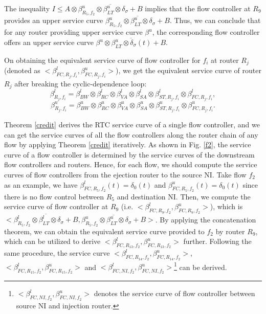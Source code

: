 \documentclass[preprint]{elsarticle}
\begin{document}
\begin{pf}
The inequality $I\leq A\otimes \overline{\beta_{R_5,f_2}^u\otimes\beta_{LT}^u\otimes\delta_\sigma+B}$ implies that the flow controller at $R_9$ provides an upper service curve $\overline{\beta_{R_5,f_2}^u\otimes\beta_{LT}^u\otimes\delta_\sigma+B}$. Thus, we can conclude that for any router providing upper service curve $\beta^u$, the corresponding flow controller offers an upper service curve $\overline{\beta^u\otimes\beta_{LT}^u\otimes\delta_\sigma(t)+B}$.
\end{pf}

On obtaining the equivalent service curve of flow controller for $f_i$ at router $R_j$ (denoted as $<\beta_{FC,R_j,f_i}^l,\beta_{FC,R_j,f_i}^u>$), we get the equivalent service curve of router $R_j$ after breaking the cyclic-dependence loop:
$$\beta_{R_j,f_i}^l=\beta_{BW}^l\otimes\beta_{RC}^l\otimes\beta_{VA}^l\otimes\beta_{SA}^l\otimes\beta_{ST,R_j,f_i}^l\otimes\beta_{FC,R_j,f_i}^l,$$
$$\beta_{R_j,f_i}^u=\beta_{BW}^u\otimes\beta_{RC}^u\otimes\beta_{VA}^u\otimes\beta_{SA}^u\otimes\beta_{ST,R_j,f_i}^u\otimes\beta_{FC,R_j,f_i}^u.$$

Theorem \ref{credit} derives the RTC service curve of a single flow controller, and we can get the service curves of all the flow controllers along the router chain of any flow by applying Theorem \ref{credit} iteratively. As shown in Fig. \ref{f2}, the service curve of a flow controller is determined by the service curves of the downstream flow controllers and routers. Hence, for each flow, we should compute the service curves of flow controllers from the ejection router to the source NI. Take flow $f_2$ as an example, we have $\beta_{FC,R_5,f_2}^l(t)=\delta_0(t)$ and $\beta_{FC,R_5,f_2}^u(t)=\delta_0(t)$ since there is no flow control between $R_5$ and destination NI. Then, we compute the service curve of flow controller at $R_{9}$ (i.e. $<\beta_{FC,R_9,f_2}^l,\beta_{FC,R_9,f_2}^u>$), which is $<\overline{\beta_{R_5,f_2}^l\otimes\beta_{LT}^l\otimes\delta_\sigma+B},\overline{\beta_{R_5,f_2}^u\otimes\beta_{LT}^u\otimes\delta_\sigma+B}>$. By applying the concatenation theorem, we can obtain the equivalent service curve provided to $f_2$ by router $R_{9}$, which can be utilized to derive $<\beta_{FC,R_{13},f_2}^l,\beta_{FC,R_{13},f_2}^u>$ further. Following the same procedure, the service curve $<\beta_{FC,R_{14},f_2}^l,\beta_{FC,R_{14},f_2}^u>$, $<\beta_{FC,R_{15},f_2}^l,\beta_{FC,R_{15},f_2}^u>$ and $<\beta_{FC,NI,f_2}^l,\beta_{FC,NI,f_2}^u>$\footnote{$<\beta_{FC,NI,f_2}^l,\beta_{FC,NI,f_2}^u>$ denotes the service curve of flow controller between source NI and injection router.} can be derived.
\end{document}

